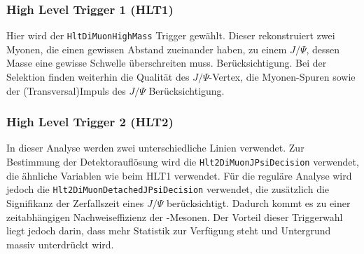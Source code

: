 \subsubsection{High Level Trigger 1 (HLT1)}
Hier wird der \texttt{HltDiMuonHighMass} Trigger gewählt. Dieser rekonstruiert zwei Myonen, die einen gewissen Abstand zueinander haben, zu einem $J/\Psi$, dessen Masse eine gewisse Schwelle überschreiten muss. Berücksichtigung. Bei der Selektion finden weiterhin die Qualität des $J/\Psi$-Vertex, die Myonen-Spuren sowie der (Transversal)Impuls des $J/\Psi$ Berücksichtigung.

\subsubsection{High Level Trigger 2 (HLT2)}
In dieser Analyse werden zwei unterschiedliche Linien verwendet. Zur Bestimmung der Detektorauflösung wird die \texttt{Hlt2DiMuonJPsiDecision} verwendet, die ähnliche Variablen wie beim HLT1 verwendet. Für die reguläre Analyse wird jedoch die \texttt{Hlt2DiMuonDetachedJPsiDecision} verwendet, die zusätzlich die Signifikanz der Zerfallszeit eines $J/\Psi$ berücksichtigt. Dadurch kommt es zu einer zeitabhängigen Nachweiseffizienz der \Bd-Mesonen. Der Vorteil dieser Triggerwahl liegt jedoch darin, dass mehr Statistik zur Verfügung steht und Untergrund massiv unterdrückt wird.

